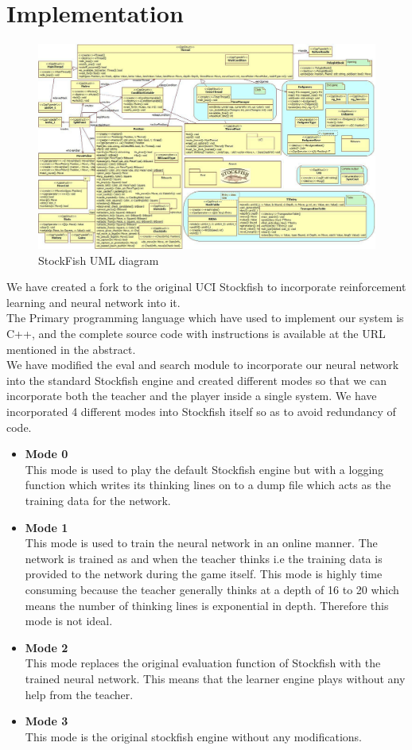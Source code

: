 \documentclass[a4paper,12pt,latin modern roman]{article}
\begin{document}
\section{Implementation}
\begin{figure}[!ht]
\centering
    \includegraphics[width=\textwidth,height=\textheight,keepaspectratio]{sf_uml.jpg}%
    \caption{StockFish UML diagram}

\end{figure}
We have created a fork to the original UCI Stockfish to incorporate reinforcement learning and neural network into it. 
\\
The Primary programming language which have used to implement our system is C++, and the complete source code with instructions is available at the URL mentioned in the abstract. \\
We have modified the eval and search module to incorporate our neural network into the standard Stockfish engine and created different modes so that we can incorporate both the teacher and the player inside a single system. We have incorporated 4 different modes into Stockfish itself so as to avoid redundancy of code.

\begin{itemize}
\item \textbf{Mode 0}\\
This mode is used to play the default Stockfish engine but with a logging function which writes its thinking lines on to a dump file which acts as the training data for the network. 
\item \textbf{Mode 1}\\
This mode is used to train the neural network in an online manner. The network is trained as and when the teacher thinks i.e the training data is provided to the network during the game itself. This mode is highly time consuming because the teacher generally thinks at a depth of 16 to 20 which means the number of thinking lines is exponential in depth. Therefore this mode is not ideal.
\item \textbf{Mode 2}\\
This mode replaces the original evaluation function of Stockfish with the trained neural network. This means that the learner engine plays without any help from the teacher.
\item \textbf{Mode 3}\\
This mode is the original stockfish engine without any modifications.
\end{itemize}
\end{document}
